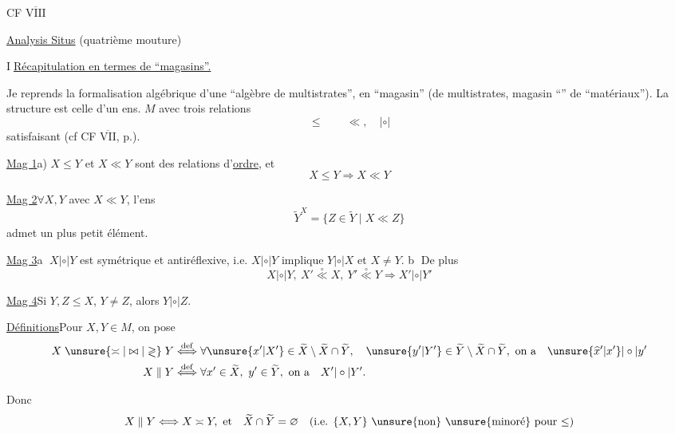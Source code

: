CF \uline{$\overline{\mathrm{VIII}}$}

\uline{Analysis Situs} (quatrième mouture)


\textcircled{I}\quad\uline{Récapitulation en termes de ``magasins''.}

Je reprends la formalisation algébrique d'une ``algèbre de multistrates'', en ``magasin'' (de multistrates, magasin ``'' de ``matériaux''). La structure est celle d'un ens. $M$ avec trois relations
\[
\leq\qquad\ll,\quad|\circ|
\]
satisfaisant (cf CF \uline{$\overline{\mathrm{VII}}$}, p.).

\uline{Mag 1}\quad a) $X\leq Y$ et $X\ll Y$ sont des relations d'\uline{ordre}, et 
\[
X\leq Y\Longrightarrow X\ll Y
\]


\uline{Mag 2}\quad $\forall X,Y$ avec $X\ll Y$, l'ens
\[
\widetilde Y^X=\{Z\in\widetilde Y\mid X\ll Z\}
\]
admet un plus petit élément.


\uline{Mag 3}\quad\textcircled{a} $X|\circ|Y$ est symétrique et antiréflexive, i.e. $X|\circ|Y$ implique $Y|\circ|X$ et $X\ne Y$. \textcircled{b} De plus
\[
X|\circ|Y,\ X'\overset{\circ}{\ll}X,\ Y'\overset{\circ}{\ll}Y\Longrightarrow X'|\circ|Y'
\]

\uline{Mag 4}\quad Si $Y,Z\leq X$,  $Y\ne Z$, alors $Y|\circ|Z$.


\uline{Définitions}\quad Pour $X,Y\in M$, on pose
\[
\begin{aligned}
X\mathrel{\unsure{\asymp|\bowtie|\gtrless}}Y
&\overset{\mathrm{def}}{\Longleftrightarrow}
\forall\unsure{x'|X'}\in\widetilde X\setminus\widetilde X\cap\widetilde Y,\quad
\unsure{y'|Y'}\in\widetilde Y\setminus\widetilde X\cap\widetilde Y,\ \text{on a}\quad\unsure{\widehat{x}'|x'}|\circ|y'\\
X\parallel Y&\overset{\mathrm{def}}{\Longleftrightarrow}
\forall x'\in\widetilde X,\ y'\in\widetilde Y,\ \text{on a}\quad X'|\circ|Y'.
\end{aligned}
\]

Donc
\[
X\parallel Y\Longleftrightarrow X\asymp Y,\ \text{et}\quad\widetilde X\cap\widetilde Y=\varnothing
\quad\text{(i.e. $\{X,Y\}$ \unsure{non} \unsure{minoré} pour $\leq$)}
\]
